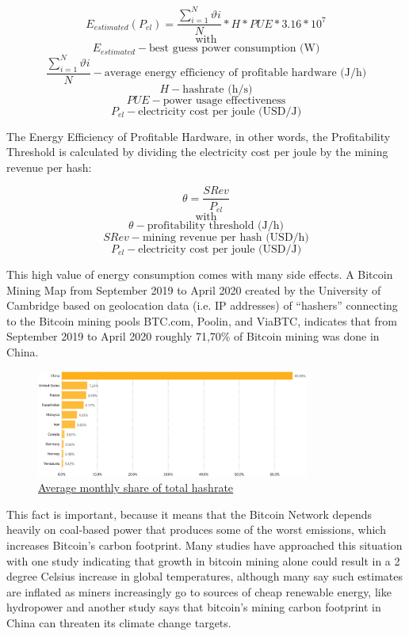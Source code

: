 \documentclass{article}
\begin{document}
\[E_{estimated}(P_{el}) = \frac{\sum_{i=1}^{N} \vartheta i}{N} * H * PUE * 3.16 * 10^7\]
\[\mbox{with}\]
\[E_{estimated} - \mbox{best guess power consumption (W)}\]
\[\frac{\sum_{i=1}^{N} \vartheta i}{N} - \mbox{average energy efficiency of profitable hardware (J/h)}\]
\[H - \mbox{hashrate (h/s)}\]
\[PUE - \mbox{power usage effectiveness}\]
\[P_{el} - \mbox{electricity cost per joule (USD/J)}\]

The Energy Efficiency of Profitable Hardware, in other words, the Profitability Threshold is calculated by dividing the electricity cost per joule by the mining revenue per hash:

\[\theta = \frac{SRev}{P_{el}}\]
\[\mbox{with}\]
\[\theta - \mbox{profitability threshold (J/h)}\]
\[SRev - \mbox{mining revenue per hash (USD/h)}\]
\[P_{el} - \mbox{electricity cost per joule (USD/J)}\]

This high value of energy consumption comes with many side effects. A  Bitcoin Mining Map from September 2019 to April 2020 created by the University of Cambridge based on geolocation data (i.e. IP addresses) of “hashers” connecting to the Bitcoin mining pools BTC.com, Poolin, and ViaBTC, indicates that from September 2019 to April 2020  roughly 71,70\% of Bitcoin mining was done in China.

\begin{figure}[H]
    \begin{center}
        \includegraphics[width=0.8\textwidth]{images/hashrate.png}
        \caption{\href{https://cbeci.org/mining_map}{\underline{Average monthly share of total hashrate}}}
    \end{center}
\end{figure}

This fact is important, because it means that the Bitcoin Network depends heavily on coal-based power that produces some of the worst emissions, which increases Bitcoin's carbon footprint. Many studies have approached  this situation with one study indicating that growth in bitcoin mining alone could result in a 2 degree Celsius increase in global temperatures, although many say such estimates are inflated as miners increasingly go to sources of cheap renewable energy, like hydropower and another study says that bitcoin’s mining carbon footprint in China can threaten its climate change targets.
\end{document}
